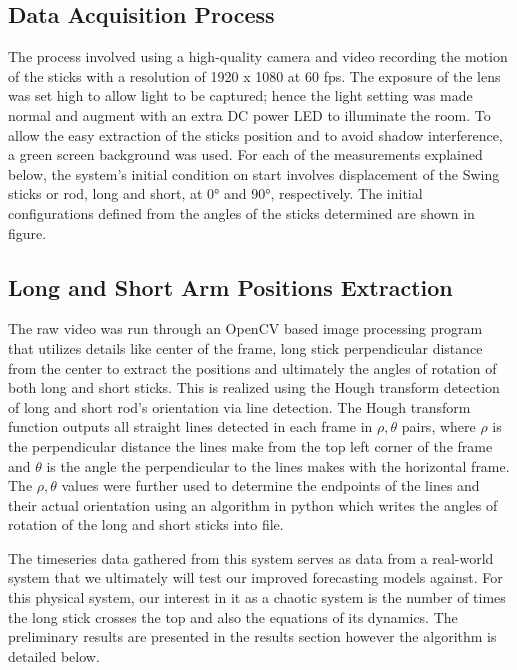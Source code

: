 \documentclass[letterpaper, 10pt, conference]{IEEEtran}
\begin{document}
        \subsection{Data Acquisition Process}
            
            The process involved using a high-quality camera and video recording the motion of the sticks with a resolution of 1920 x 1080 at 60 fps. The exposure of the lens was set high to allow light to be captured; hence the light setting was made normal and augment with an extra DC power LED to illuminate the room. To allow the easy extraction of the sticks position and to avoid shadow interference, a green screen background was used. For each of the measurements explained below, the system's initial condition on start involves displacement of the Swing sticks or rod, long and short, at 0° and 90°, respectively. The initial configurations defined from the angles of the sticks determined are shown in figure. 

        \subsection{Long and Short Arm Positions Extraction}
            The raw video was run through an OpenCV based image processing program that utilizes details like center of the frame, long stick perpendicular distance from the center to extract the positions and ultimately the angles of rotation of both long and short sticks.
            This is realized using the Hough transform detection of long and short rod's orientation via line detection. The Hough transform function outputs all straight lines detected in each frame in $\rho, \theta$ pairs, where $\rho$ is the perpendicular distance the lines make from the top left corner of the frame and $\theta$ is the angle the perpendicular to the lines makes with the horizontal frame. The  $\rho, \theta$  values were further used to determine the endpoints of the lines and their actual orientation using an algorithm in python which writes the angles of rotation of the long and short sticks into file.
        
            The timeseries data gathered from this system serves as data from a real-world system that we ultimately will test our improved forecasting models against. For this physical system, our interest in it as a chaotic system is the number of times the long stick crosses the top and also the equations of its dynamics. The preliminary results are presented in the results section however the algorithm is detailed below.
            
\end{document}

